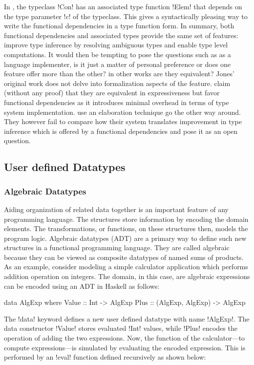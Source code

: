 \documentclass[manuscript,screen,nonacm]{acmart}
\begin{document}
In , the typeclass !Con! has an associated type function !Elem! that depends on the type parameter !c! of the typeclass. This gives a syntactically pleasing way to write the functional dependencies in a type function form.
In summary, both functional dependencies and associated types provide the same set of features: improve type inference by resolving ambiguous types and enable type level computations. It would then be tempting to pose the questions such as as a language implementer, is it just a matter of personal preference or does one feature offer more than the other? in other works are they equivalent? Jones' original work does not delve into formalization aspects of the feature. \citet{jones_language_2008} claim (without any proof) that they are equivalent in expressiveness but favor functional dependencies as it introduces minimal overhead in terms of type system implementation. \citet{karachalias_elaboration_2017} use an elaboration technique go the other way around. They however fail to compare how their system translates improvement in type inference which is offered by a functional dependencies and pose it as an open question.

\subsection{User defined Datatypes}
\subsubsection{Algebraic Datatypes}
Aiding organization of related data together is an important feature of any programming language. The structures store information by encoding the domain elements. The transformations, or functions, on these structures then, models the program logic. Algebraic datatypes (ADT) are a primary way to define such new structures in a functional programming language. They are called algebraic because they can be viewed as composite datatypes of named sums of products. As an example, consider modeling a simple calculator application which performs addition operation on integers. The domain, in this case, are algebraic expressions can be encoded using an ADT in Haskell as follows:

\begin{CenteredBox}
\begin{code}
data AlgExp where
 Value :: Int -> AlgExp
 Plus :: (AlgExp, AlgExp) -> AlgExp
\end{code}
\end{CenteredBox}
The !data! keyword defines a new user defined datatype with name !AlgExp!.
The data constructor !Value! stores evaluated !Int! values, while !Plus! encodes the operation of adding the two expressions. Now, the function of the calculator---to compute expressions---is simulated by evaluating the encoded expression. This is performed by an !eval! function defined recursively as shown below:
\end{document}
